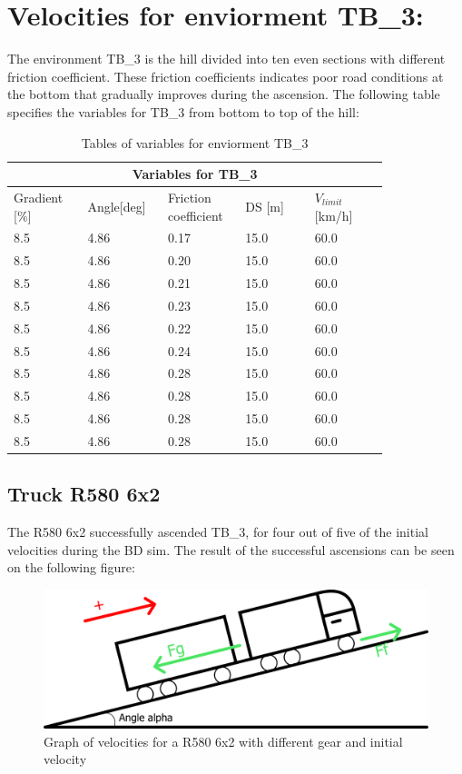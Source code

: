 \documentclass[noprint]{uit-thesis}
\begin{document}
\section{Velocities for enviorment TB\_3:}
The environment TB\_3 is the hill divided into ten even sections with different friction coefficient. These friction coefficients indicates poor road conditions at the bottom that gradually improves during the ascension. The following table specifies the variables for TB\_3 from bottom to top of the hill:
\renewcommand{\arraystretch}{1.2}
\begin{table}[H]
\center
\begin{tabular}{|p{0.17\linewidth} | p{0.16\linewidth} | p{0.16\linewidth} | p{0.16\linewidth} | p{0.17\linewidth} |} 

 \hline
\multicolumn{5}{|c|}{\textbf{Variables for TB\_3}} \\
 \hline 
Gradient [\%]  & Angle[deg]  & \makecell[l]{Friction\\coefficient} & DS [m]  & $V_{limit}$[km/h]  \\
\hline
8.5 & 4.86 & 0.17 & 15.0 & 60.0 \\
8.5 & 4.86 & 0.20 & 15.0 & 60.0 \\
8.5 & 4.86 & 0.21 & 15.0 & 60.0 \\
8.5 & 4.86 & 0.23 & 15.0 & 60.0 \\
8.5 & 4.86 & 0.22 & 15.0 & 60.0 \\
8.5 & 4.86 & 0.24 & 15.0 & 60.0 \\
8.5 & 4.86 & 0.28 & 15.0 & 60.0 \\
8.5 & 4.86 & 0.28 & 15.0 & 60.0 \\
8.5 & 4.86 & 0.28 & 15.0 & 60.0 \\
8.5 & 4.86 & 0.28 & 15.0 & 60.0 \\
 \hline
\end{tabular}
\caption{Tables of variables for enviorment TB\_3}
\label{tab:TB3}
\end{table}

\subsection{Truck R580 6x2}
The R580 6x2 successfully ascended TB\_3, for four out of five of the initial velocities during the BD sim. The result of the successful ascensions can be seen on the following figure:
\begin{figure}[H]
\includegraphics[width=\textwidth, height=0.38\textheight]{photo/freeBodyDiagram.png}
\caption{Graph of velocities for a R580 6x2 with different gear and initial velocity}
\label{fig:TB36x2}
\end{figure}
\end{document}
